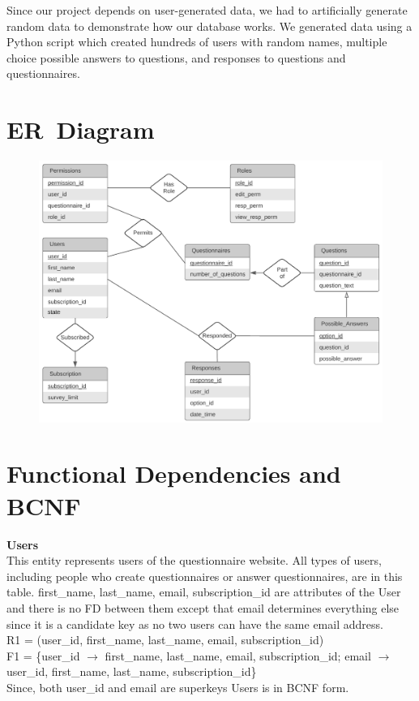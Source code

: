 \documentclass[12pt, oneside]{article}
\newcommand{\tb}[1]{\textbf{#1}}
\begin{document}
    Since our project depends on user-generated data, we had to artificially generate random data to demonstrate how our database works. We generated data using a Python script which created hundreds of users with random names, multiple choice possible answers to questions, and responses to questions and questionnaires.
    \section{ER\ Diagram}
    \FloatBarrier
    \begin{figure}[H] 
        \centerline{
        \includegraphics[width=\textwidth]{newERdiagram.PNG}
        }
    \end{figure}
    \newpage
    \section{Functional Dependencies and BCNF}
    \tb{Users} \\
    This entity represents users of the questionnaire website.
    All types of users, including people who create questionnaires
    or answer questionnaires, are in this table. first\_name, last\_name, email, subscription\_id are attributes of the User and there is no FD between them except that email determines everything else since it is a candidate key as no two users can have the same email address. \\
    R1 = (user\_id, first\_name, last\_name, email, subscription\_id) \\
    F1 = \{user\_id \(\rightarrow\) first\_name, last\_name, email, subscription\_id; email \(\rightarrow\) user\_id, first\_name, last\_name, subscription\_id\} \\
    Since, both user\_id and email are superkeys Users is in BCNF form. 
    \\
\end{document}
